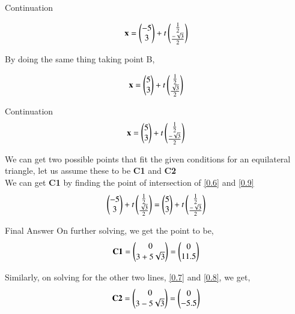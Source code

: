 \documentclass{beamer}
\begin{document}
\begin{frame}{Continuation}

\begin{align}
    \textbf{x} = \begin{pmatrix}-5\\3\end{pmatrix}+t\begin{pmatrix}\frac{1}{2}\\\frac{-\sqrt{3}}{2}\end{pmatrix}
    \label{0.7}
\end{align}

By doing the same thing taking point B,

\begin{align}
    \textbf{x} = \begin{pmatrix}5\\3\end{pmatrix}+t\begin{pmatrix}\frac{1}{2}\\\frac{\sqrt{3}}{2}\end{pmatrix}
    \label{0.8}
\end{align}

\end{frame}
\begin{frame}{Continuation}
\begin{align}
    \textbf{x} = \begin{pmatrix}5\\3\end{pmatrix}+t\begin{pmatrix}\frac{1}{2}\\\frac{-\sqrt{3}}{2}\end{pmatrix}
    \label{0.9}
\end{align}

We can get two possible points that fit the given conditions for an equilateral triangle, let us assume these to be \textbf{C1} and \textbf{C2}\\

We can get \textbf{C1} by finding the point of intersection of \ref{0.6} and \ref{0.9}
\begin{align}
    \begin{pmatrix}-5\\3\end{pmatrix} + t\begin{pmatrix}\frac{1}{2}\\\frac{\sqrt{3}}{2}\end{pmatrix} = \begin{pmatrix}5\\3\end{pmatrix} +t\begin{pmatrix}\frac{1}{2}\\\frac{-\sqrt{3}}{2}\end{pmatrix}
    \label{0.10}
\end{align}
\end{frame}
\begin{frame}{Final Answer}
On further solving, we get the point to be,
\begin{align}
    \textbf{C1} = \begin{pmatrix}0\\3+5\sqrt{3}\end{pmatrix} = \begin{pmatrix}0\\11.5\end{pmatrix}
    \label{0.11}
\end{align}

Similarly, on solving for the other two lines, \ref{0.7} and \ref{0.8}, we get,
\begin{align}
    \textbf{C2} = \begin{pmatrix}0\\3-5\sqrt{3}\end{pmatrix} = \begin{pmatrix}0\\-5.5\end{pmatrix}
    \label{0.12}
\end{align}
\end{frame}
\end{document}
